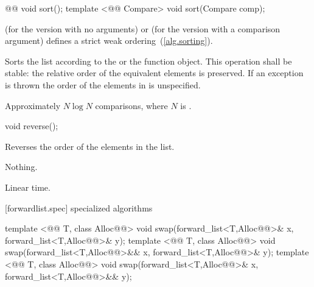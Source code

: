 \documentclass[american,twoside]{book}
\begin{document}
\begin{itemdecl}
@@ void sort();
template <@@ Compare> void sort(Compare comp);
\end{itemdecl}

\begin{itemdescr}
\pnum
\requires {} (for the version with no arguments) or  (for the version with a comparison argument) defines a strict weak ordering~(\ref{alg.sorting}).

\pnum
\effects Sorts the list according to the  or the  function object. This operation shall be stable: the relative order of the equivalent elements is preserved. If an exception is thrown the order of the elements in  is unspecified.

\pnum
\complexity Approximately $N \log N$ comparisons, where $N$ is .
\end{itemdescr}

\begin{itemdecl}
void reverse();
\end{itemdecl}

\begin{itemdescr}
\pnum
\effects Reverses the order of the elements in the list.

\pnum
\throws Nothing.

\pnum
\complexity Linear time.
\end{itemdescr}

[forwardlist.spec]{ specialized algorithms}

\begin{itemdecl}
template <@@ T, class Alloc@@>
  void swap(forward_list<T,Alloc@@>& x, forward_list<T,Alloc@@>& y);
template <@@ T, class Alloc@@>
  void swap(forward_list<T,Alloc@@>&& x, forward_list<T,Alloc@@>& y);
template <@@ T, class Alloc@@>
  void swap(forward_list<T,Alloc@@>& x, forward_list<T,Alloc@@>&& y);
\end{itemdecl}

\begin{itemdescr}
\pnum
\effects {}
\end{itemdescr}
\end{document}
